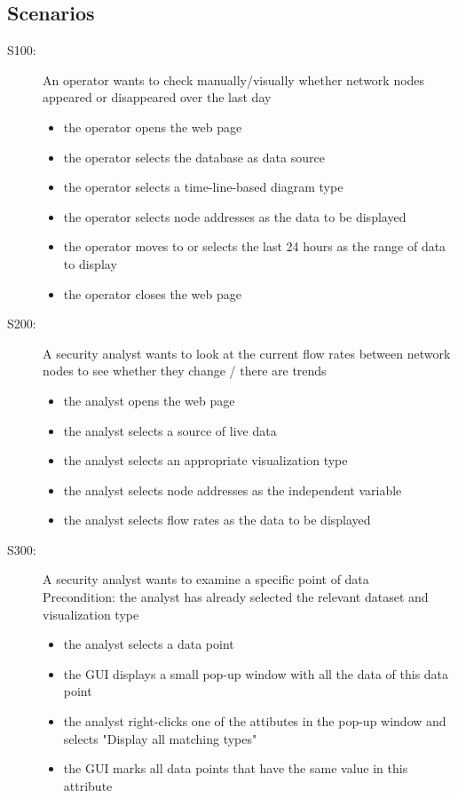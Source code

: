 \documentclass[twoside, english, final]{Pflichtenheft}
\begin{document}
\subsection{Scenarios}

\begin{description}
	\item[S100:] An operator wants to check manually/visually whether network nodes appeared or disappeared over the last day
	      \begin{itemize}
		      \item{the operator opens the web page}
		      \item{the operator selects the database as \gls{data source}}
		      \item{the operator selects a time-line-based \gls{diagram type}}
		      \item{the operator selects node addresses as the data to be displayed}
		      \item{the operator moves to or selects the last 24 hours as the range of data to display}
		      \item{the operator closes the web page}
	      \end{itemize}



	\item[S200:] A security analyst wants to look at the current flow rates between network nodes to see whether they change / there are trends
	      \begin{itemize}
		      \item{the analyst opens the web page}
		      \item{the analyst selects a source of live data}
		      \item{the analyst selects an appropriate visualization type}
		      \item{the analyst selects node addresses as the independent variable}
		      \item{the analyst selects flow rates as the data to be displayed}
	      \end{itemize}



	\item[S300:] A security analyst wants to examine a specific point of data
	      \\
	      Precondition: the analyst has already selected the relevant dataset and visualization type
	      \begin{itemize}
		      \item{the analyst selects a data point}
		      \item{the GUI displays a small pop-up window with all the data of this data point}
		      \item{the analyst right-clicks one of the attibutes in the pop-up window and selects "Display all matching types"}
		      \item{the GUI marks all data points that have the same value in this attribute}
	      \end{itemize}




\end{description}
\end{document}
